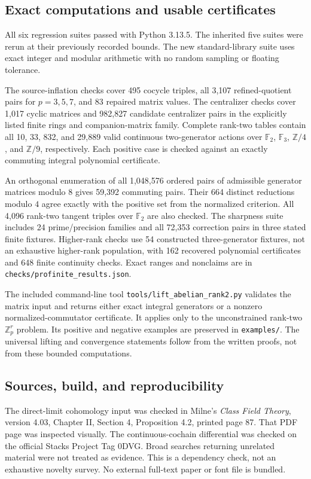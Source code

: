 \documentclass[11pt]{article}
\theoremstyle{definition}
\theoremstyle{remark}
\begin{document}
\subsection{Exact computations and usable certificates}
All six regression suites passed with Python 3.13.5. The inherited five suites were rerun at their previously recorded bounds. The new standard-library suite uses exact integer and modular arithmetic with no random sampling or floating tolerance.

The source-inflation checks cover 495 cocycle triples, all 3,107 refined-quotient pairs for $p=3,5,7$, and 83 repaired matrix values. The centralizer checks cover 1,017 cyclic matrices and 982,827 candidate centralizer pairs in the explicitly listed finite rings and companion-matrix family. Complete rank-two tables contain all 10, 33, 832, and 29,889 valid continuous two-generator actions over $\mathbb F_2$, $\mathbb F_3$, $\mathbb Z/4$, and $\mathbb Z/9$, respectively. Each positive case is checked against an exactly commuting integral polynomial certificate.

An orthogonal enumeration of all 1,048,576 ordered pairs of admissible generator matrices modulo $8$ gives 59,392 commuting pairs. Their 664 distinct reductions modulo $4$ agree exactly with the positive set from the normalized criterion. All 4,096 rank-two tangent triples over $\mathbb F_2$ are also checked. The sharpness suite includes 24 prime/precision families and all 72,353 correction pairs in three stated finite fixtures. Higher-rank checks use 54 constructed three-generator fixtures, not an exhaustive higher-rank population, with 162 recovered polynomial certificates and 648 finite continuity checks. Exact ranges and nonclaims are in \texttt{checks/profinite\_results.json}.

The included command-line tool \texttt{tools/lift\_abelian\_rank2.py} validates the matrix input and returns either exact integral generators or a nonzero normalized-commutator certificate. It applies only to the unconstrained rank-two $\mathbb Z_p^r$ problem. Its positive and negative examples are preserved in \texttt{examples/}. The universal lifting and convergence statements follow from the written proofs, not from these bounded computations.

\subsection{Sources, build, and reproducibility}
The direct-limit cohomology input was checked in Milne's \emph{Class Field Theory}, version 4.03, Chapter II, Section 4, Proposition 4.2, printed page 87. That PDF page was inspected visually. The continuous-cochain differential was checked on the official Stacks Project Tag 0DVG. Broad searches returning unrelated material were not treated as evidence. This is a dependency check, not an exhaustive novelty survey. No external full-text paper or font file is bundled.
\end{document}
